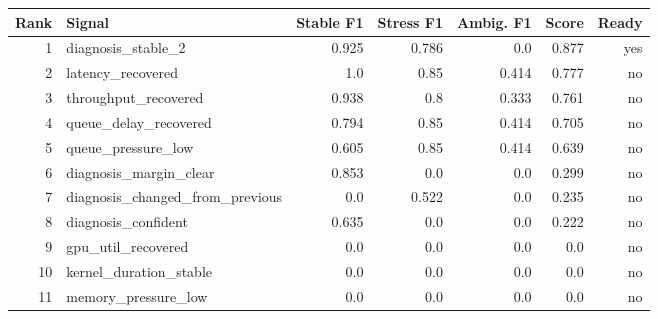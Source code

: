 \begin{tabular}{rlrrrrr}
\hline
Rank & Signal & Stable F1 & Stress F1 & Ambig. F1 & Score & Ready \\
\hline
1 & diagnosis_stable_2 & 0.925 & 0.786 & 0.0 & 0.877 & yes \\
2 & latency_recovered & 1.0 & 0.85 & 0.414 & 0.777 & no \\
3 & throughput_recovered & 0.938 & 0.8 & 0.333 & 0.761 & no \\
4 & queue_delay_recovered & 0.794 & 0.85 & 0.414 & 0.705 & no \\
5 & queue_pressure_low & 0.605 & 0.85 & 0.414 & 0.639 & no \\
6 & diagnosis_margin_clear & 0.853 & 0.0 & 0.0 & 0.299 & no \\
7 & diagnosis_changed_from_previous & 0.0 & 0.522 & 0.0 & 0.235 & no \\
8 & diagnosis_confident & 0.635 & 0.0 & 0.0 & 0.222 & no \\
9 & gpu_util_recovered & 0.0 & 0.0 & 0.0 & 0.0 & no \\
10 & kernel_duration_stable & 0.0 & 0.0 & 0.0 & 0.0 & no \\
11 & memory_pressure_low & 0.0 & 0.0 & 0.0 & 0.0 & no \\
\hline
\end{tabular}
